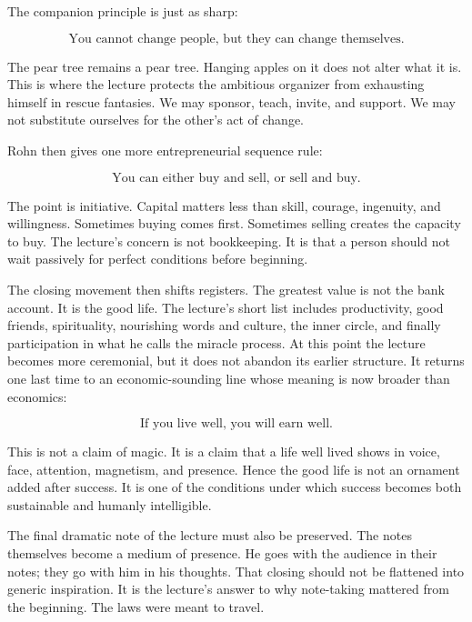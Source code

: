 The companion principle is just as sharp:

\begin{equation}
\text{You cannot change people, but they can change themselves.}
\end{equation}

The pear tree remains a pear tree. Hanging apples on it does not alter what it is. This is where the lecture protects the ambitious organizer from exhausting himself in rescue fantasies. We may sponsor, teach, invite, and support. We may not substitute ourselves for the other's act of change.

Rohn then gives one more entrepreneurial sequence rule:

\begin{equation}
\text{You can either buy and sell, or sell and buy.}
\end{equation}

The point is initiative. Capital matters less than skill, courage, ingenuity, and willingness. Sometimes buying comes first. Sometimes selling creates the capacity to buy. The lecture's concern is not bookkeeping. It is that a person should not wait passively for perfect conditions before beginning.

The closing movement then shifts registers. The greatest value is not the bank account. It is the good life. The lecture's short list includes productivity, good friends, spirituality, nourishing words and culture, the inner circle, and finally participation in what he calls the miracle process. At this point the lecture becomes more ceremonial, but it does not abandon its earlier structure. It returns one last time to an economic-sounding line whose meaning is now broader than economics:

\begin{equation}
\text{If you live well, you will earn well.}
\end{equation}

This is not a claim of magic. It is a claim that a life well lived shows in voice, face, attention, magnetism, and presence. Hence the good life is not an ornament added after success. It is one of the conditions under which success becomes both sustainable and humanly intelligible.

The final dramatic note of the lecture must also be preserved. The notes themselves become a medium of presence. He goes with the audience in their notes; they go with him in his thoughts. That closing should not be flattened into generic inspiration. It is the lecture's answer to why note-taking mattered from the beginning. The laws were meant to travel.

